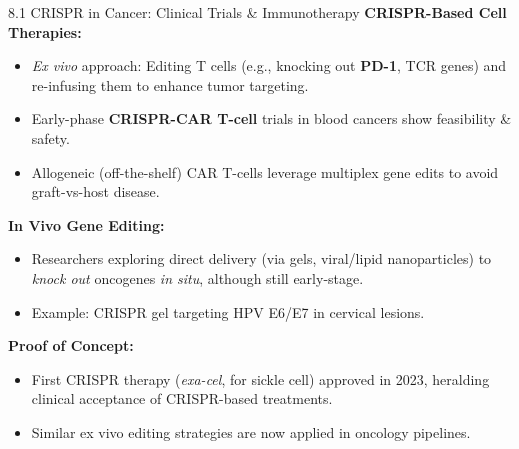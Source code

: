 \documentclass[10pt]{beamer}
\begin{document}
\begin{frame}{8.1 CRISPR in Cancer: Clinical Trials \& Immunotherapy}
  \textbf{CRISPR-Based Cell Therapies:}
  \begin{itemize}
    \item \textit{Ex vivo} approach: Editing T cells (e.g., knocking out \textbf{PD-1}, TCR genes)
          and re-infusing them to enhance tumor targeting.
    \item Early-phase \textbf{CRISPR-CAR T-cell} trials in blood cancers show feasibility \& safety.
    \item Allogeneic (off-the-shelf) CAR T-cells leverage multiplex gene edits to avoid graft-vs-host disease.
  \end{itemize}

  \vspace{0.3em}
  \textbf{In Vivo Gene Editing:}
  \begin{itemize}
    \item Researchers exploring direct delivery (via gels, viral/lipid nanoparticles) to \textit{knock out}
          oncogenes \textit{in situ}, although still early-stage.
    \item Example: CRISPR gel targeting HPV E6/E7 in cervical lesions.
  \end{itemize}

  \vspace{0.3em}
  \textbf{Proof of Concept:}
  \begin{itemize}
    \item First CRISPR therapy (\emph{exa-cel}, for sickle cell) approved in 2023,
          heralding clinical acceptance of CRISPR-based treatments.
    \item Similar ex vivo editing strategies are now applied in oncology pipelines.
  \end{itemize}
\end{frame}
\end{document}

